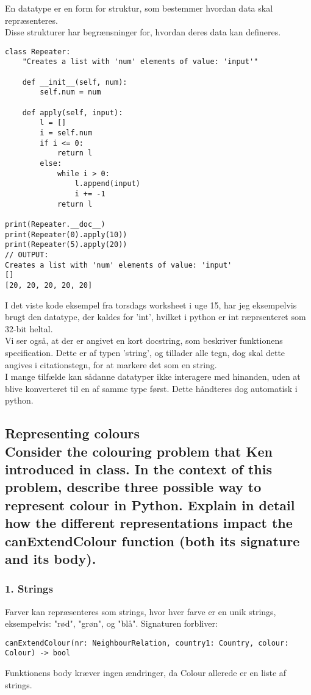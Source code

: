 \documentclass[a4paper,12pt]{article}
\begin{document}
En datatype er en form for struktur, som bestemmer hvordan data skal repræsenteres.\\
Disse strukturer har begrænsninger for, hvordan deres data kan defineres.
\begin{lstlisting}
class Repeater:
    "Creates a list with 'num' elements of value: 'input'"

    def __init__(self, num):
        self.num = num
    
    def apply(self, input):
        l = []
        i = self.num
        if i <= 0:
            return l
        else:
            while i > 0:
                l.append(input)
                i += -1
            return l

print(Repeater.__doc__)
print(Repeater(0).apply(10))
print(Repeater(5).apply(20))
// OUTPUT:
Creates a list with 'num' elements of value: 'input'
[]
[20, 20, 20, 20, 20]
\end{lstlisting}
I det viste kode eksempel fra torsdags worksheet i uge 15, har jeg eksempelvis brugt den datatype, der kaldes for 'int', hvilket i python er int ræprsenteret som 32-bit heltal.\\
Vi ser også, at der er angivet en kort docstring, som beskriver funktionens specification. Dette er af typen 'string', og tillader alle tegn, dog skal dette angives i citationstegn, for at markere det som en string.\\
I mange tilfælde kan sådanne datatyper ikke interagere med hinanden, uden at blive konverteret til en af samme type først. Dette håndteres dog automatisk i python.


\subsection[Representing colours]{Representing colours\\
Consider the colouring problem that Ken introduced in class.
In the context of this problem, describe three possible way to represent colour in Python.
Explain in detail how the different representations impact the canExtendColour function (both its signature and its body).}

\subsubsection*{1. Strings}
Farver kan repræsenteres som strings, hvor hver farve er en unik strings, eksempelvis: "rød", "grøn", og "blå".
Signaturen forbliver:
\begin{lstlisting}
canExtendColour(nr: NeighbourRelation, country1: Country, colour: Colour) -> bool
\end{lstlisting}
Funktionens body kræver ingen ændringer, da Colour allerede er en liste af strings.
\end{document}
